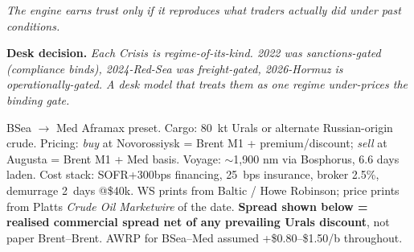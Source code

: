 \documentclass[10pt,a4paper]{article}
\begin{document}
\textit{The engine earns trust only if it reproduces what traders actually did under past conditions.}

\noindent\textcolor{obred}{\textbf{Desk decision.}} \emph{Each Crisis is regime-of-its-kind. 2022 was sanctions-gated (compliance binds), 2024-Red-Sea was freight-gated, 2026-Hormuz is operationally-gated. A desk model that treats them as one regime under-prices the binding gate.}

\vspace{0.2cm}

\begin{callout}
\footnotesize
BSea $\rightarrow$ Med Aframax preset. Cargo: 80~kt Urals or alternate Russian-origin crude. Pricing: \emph{buy} at Novorossiysk = Brent M1 + premium/discount; \emph{sell} at Augusta = Brent M1 + Med basis. Voyage: $\sim$1{,}900 nm via Bosphorus, 6.6 days laden. Cost stack: SOFR+300bps financing, 25~bps insurance, broker 2.5\%, demurrage 2~days @\$40k. WS prints from Baltic / Howe Robinson; price prints from Platts \emph{Crude Oil Marketwire} of the date. \textbf{Spread shown below = realised commercial spread net of any prevailing Urals discount}, not paper Brent--Brent. AWRP for BSea--Med assumed +\$0.80--\$1.50/b throughout.
\end{callout}

\vspace{0.2cm}
\end{document}
